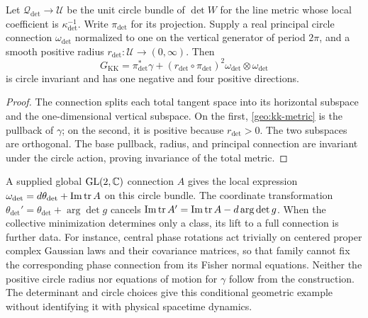 Let $\mathscr Q_{\det}\to\mathcal U$ be the unit circle bundle of $\det W$ for the line metric whose local coefficient is $\kappa_{\det}^{-1}$. Write $\pi_{\det}$ for its projection. Supply a real principal circle connection $\omega_{\det}$ normalized to one on the vertical generator of period $2\pi$, and a smooth positive radius $r_{\det}:\mathcal U\to(0,\infty)$. Then
\begin{equation}
G_{\mathrm{KK}}
=\pi_{\det}^*\gamma
+(r_{\det}\circ\pi_{\det})^2\omega_{\det}\otimes\omega_{\det}
\label{geo:kk-metric}
\end{equation}
is circle invariant and has one negative and four positive directions.
\begin{proof}
The connection splits each total tangent space into its horizontal subspace and the one-dimensional vertical subspace. On the first, \cref{geo:kk-metric} is the pullback of $\gamma$; on the second, it is positive because $r_{\det}>0$. The two subspaces are orthogonal. The base pullback, radius, and principal connection are invariant under the circle action, proving invariance of the total metric.
\end{proof}

A supplied global $\mathrm{GL}(2,\mathbb C)$ connection $A$ gives the local expression
$\omega_{\det}=d\theta_{\det}+\operatorname{Im}\operatorname{tr} A$ on this circle bundle. The coordinate transformation $\theta_{\det}'=\theta_{\det}+\arg\det g$ cancels
$\operatorname{Im}\operatorname{tr} A'=\operatorname{Im}\operatorname{tr} A-d\arg\det g$.
When the collective minimization determines only a class, its lift to a full connection is further data. For instance, central phase rotations act trivially on centered proper complex Gaussian laws and their covariance matrices, so that family cannot fix the corresponding phase connection from its Fisher normal equations. Neither the positive circle radius nor equations of motion for $\gamma$ follow from the construction. The determinant and circle choices give this conditional geometric example without identifying it with physical spacetime dynamics.
